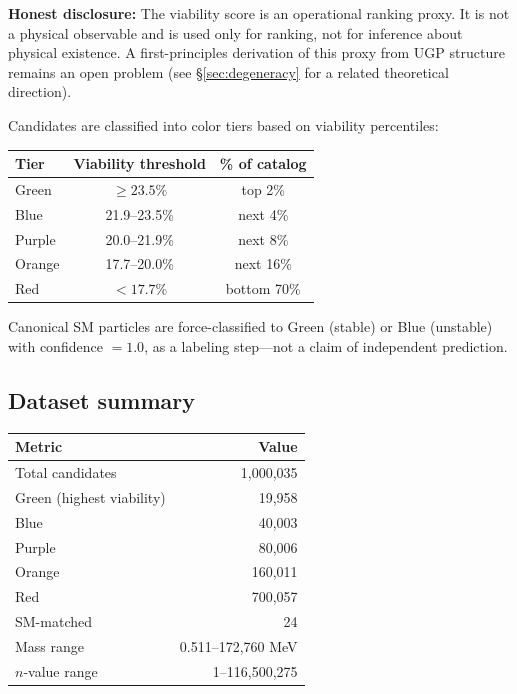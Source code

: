 \documentclass[12pt]{article}
\numberwithin{equation}{section}
\begin{document}
\textbf{Honest disclosure:} The viability score is an operational ranking proxy. It is not a physical observable and is used only for ranking, not for inference about physical existence. A first-principles derivation of this proxy from UGP structure remains an open problem (see \S\ref{sec:degeneracy} for a related theoretical direction).

Candidates are classified into color tiers based on viability percentiles:

\begin{center}
\begin{tabular}{lcc}
\toprule
Tier & Viability threshold & \% of catalog \\
\midrule
Green & $\geq 23.5\%$ & top 2\% \\
Blue & 21.9--23.5\% & next 4\% \\
Purple & 20.0--21.9\% & next 8\% \\
Orange & 17.7--20.0\% & next 16\% \\
Red & $<17.7\%$ & bottom 70\% \\
\bottomrule
\end{tabular}
\end{center}

Canonical SM particles are force-classified to Green (stable) or Blue (unstable) with confidence $= 1.0$, as a labeling step---not a claim of independent prediction.

\subsection{Dataset summary}

\begin{center}
\begin{tabular}{lr}
\toprule
Metric & Value \\
\midrule
Total candidates & 1,000,035 \\
Green (highest viability) & 19,958 \\
Blue & 40,003 \\
Purple & 80,006 \\
Orange & 160,011 \\
Red & 700,057 \\
SM-matched & 24 \\
Mass range & 0.511--172,760 MeV \\
$n$-value range & 1--116,500,275 \\
\bottomrule
\end{tabular}
\end{center}
\end{document}
